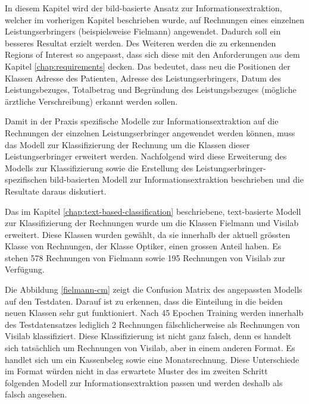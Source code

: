In diesem Kapitel wird der bild-basierte Ansatz zur Informationsextraktion, welcher im vorherigen Kapitel beschrieben wurde, auf Rechnungen eines einzelnen Leistungserbringers (beispielsweise Fielmann) angewendet. Dadurch soll ein besseres Resultat erzielt werden. Des Weiteren werden die zu erkennenden Regions of Interest so angepasst, dass sich diese mit den Anforderungen aus dem Kapitel \ref{chap:requirements} decken. Das bedeutet, dass neu die Positionen der Klassen Adresse des Patienten, Adresse des Leistungserbringers, Datum des Leistungsbezuges, Totalbetrag und Begründung des Leistungsbezuges (mögliche ärztliche Verschreibung) erkannt werden sollen.

Damit in der Praxis spezifische Modelle zur Informationsextraktion auf die Rechnungen der einzelnen Leistungserbringer angewendet werden können, muss das Modell zur Klassifizierung der Rechnung um die Klassen dieser Leistungserbringer erweitert werden. Nachfolgend wird diese Erweiterung des Modells zur Klassifizierung sowie die Erstellung des Leistungserbringer-spezifischen bild-basierten Modell zur Informationsextraktion beschrieben und die Resultate daraus diskutiert.

Das im Kapitel \ref{chap:text-based-classification} beschriebene, text-basierte Modell zur Klassifizierung der Rechnungen wurde um die Klassen Fielmann und Visilab erweitert. Diese Klassen wurden gewählt, da sie innerhalb der aktuell grössten Klasse von Rechnungen, der Klasse Optiker, einen grossen Anteil haben. Es stehen 578 Rechnungen von Fielmann sowie 195 Rechnungen von Visilab zur Verfügung.

Die Abbildung \ref{fielmann-cm} zeigt die Confusion Matrix des angepassten Modells auf den Testdaten. Darauf ist zu erkennen, dass die Einteilung in die beiden neuen Klassen sehr gut funktioniert. Nach 45 Epochen Training werden innerhalb des Testdatensatzes lediglich 2 Rechnungen fälschlicherweise als Rechnungen von Visilab klassifiziert. Diese Klassifizierung ist nicht ganz falsch, denn es handelt sich tatsächlich um Rechnungen von Visilab, aber in einem anderen Format. Es handlet sich um ein Kassenbeleg sowie eine Monatsrechnung. Diese Unterschiede im Format würden nicht in das erwartete Muster des im zweiten Schritt folgenden Modell zur Informationsextraktion passen und werden deshalb als falsch angesehen.

